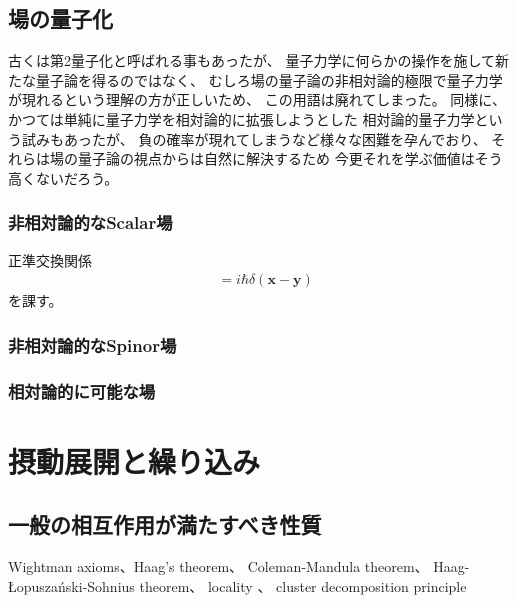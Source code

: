 \subsection{場の量子化}

古くは第2量子化と呼ばれる事もあったが、
量子力学に何らかの操作を施して新たな量子論を得るのではなく、
むしろ場の量子論の非相対論的極限で量子力学が現れるという理解の方が正しいため、
この用語は廃れてしまった。
同様に、かつては単純に量子力学を相対論的に拡張しようとした
相対論的量子力学という試みもあったが、
負の確率が現れてしまうなど様々な困難を孕んでおり、
それらは場の量子論の視点からは自然に解決するため
今更それを学ぶ価値はそう高くないだろう。

\subsubsection{非相対論的なScalar場}

正準交換関係
\begin{align}
    [\hat{\phi}(\bm{x}), \hat{\pi}(\bm{y})]
    &=
    i \hbar \delta(\bm{x} - \bm{y})
\end{align}
を課す。

\subsubsection{非相対論的なSpinor場}

\subsubsection{相対論的に可能な場}
\label{representation of Lorentz group}

\section{摂動展開と繰り込み}

\subsection{一般の相互作用が満たすべき性質}
Wightman axioms、Haag's theorem、
Coleman-Mandula theorem、
Haag-\L{}opusza\'nski-Sohnius theorem、
locality
\label{locality}
、
cluster decomposition principle